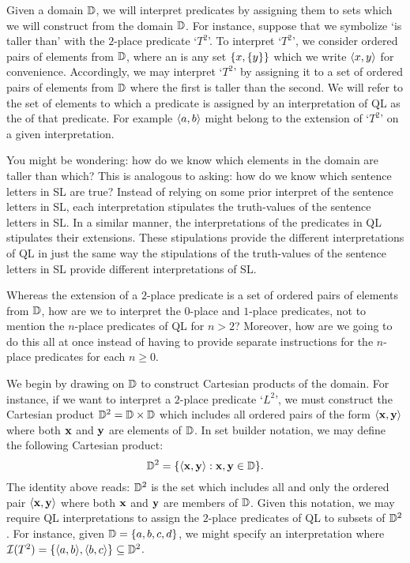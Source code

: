 Given a domain $\mathbb{D}$, we will interpret predicates by assigning them to sets which we will construct from the domain $\mathbb{D}$.
For instance, suppose that we symbolize `is taller than' with the $2$-place predicate `$T^2$'.
To interpret `$T^2$', we consider ordered pairs of elements from $\mathbb{D}$, where an  is any set $\lbrace x,\lbrace y\rbrace\rbrace$ which we write $\langle x,y\rangle$ for convenience. 
Accordingly, we may interpret `$T^2$' by assigning it to a set of ordered pairs of elements from $\mathbb{D}$ where the first is taller than the second.
We will refer to the set of elements to which a predicate is assigned by an interpretation of QL as the  of that predicate.
For example $\langle a,b\rangle$ might belong to the extension of `$T^2$' on a given interpretation. 

You might be wondering: how do we know which elements in the domain are taller than which?
This is analogous to asking: how do we know which sentence letters in SL are true?
Instead of relying on some prior interpret of the sentence letters in SL, each interpretation stipulates the truth-values of the sentence letters in SL.
In a similar manner, the interpretations of the predicates in QL stipulates their extensions.
These stipulations provide the different interpretations of QL in just the same way the stipulations of the truth-values of the sentence letters in SL provide different interpretations of SL.

Whereas the extension of a $2$-place predicate is a set of ordered pairs of elements from $\mathbb{D}$, how are we to interpret the $0$-place and $1$-place predicates, not to mention the $n$-place predicates of QL for $n>2$?
Moreover, how are we going to do this all at once instead of having to provide separate instructions for the $n$-place predicates for each $n\geq 0$.

We begin by drawing on $\mathbb{D}$ to construct Cartesian products of the domain.
For instance, if we want to interpret a $2$-place predicate `$L^2$', we must construct the Cartesian product $\mathbb{D}^2=\mathbb{D}\times\mathbb{D}$ which includes all ordered pairs of the form $\langle\mathbf{x},\mathbf{y}\rangle$ where both $\mathbf{x}$ and $\mathbf{y}$ are elements of $\mathbb{D}$.
In set builder notation, we may define the following Cartesian product: 
  $$ \mathbb{D}^2 = \lbrace\langle\mathbf{x},\mathbf{y}\rangle:\mathbf{x},\mathbf{y}\in\mathbb{D}\rbrace. $$
The identity above reads: $\mathbb{D}^2$ is the set which includes all and only the ordered pair $\langle\mathbf{x},\mathbf{y}\rangle$ where both $\mathbf{x}$ and $\mathbf{y}$ are members of $\mathbb{D}$. 
Given this notation, we may require QL interpretations to assign the $2$-place predicates of QL to subsets of $\mathbb{D}^2$. 
For instance, given $\mathbb{D}=\lbrace a,b,c,d\rbrace$, we might specify an interpretation where $\mathcal{I}(T^2)=\lbrace\langle a,b\rangle,\langle b,c\rangle\rbrace\subseteq\mathbb{D}^2$.

